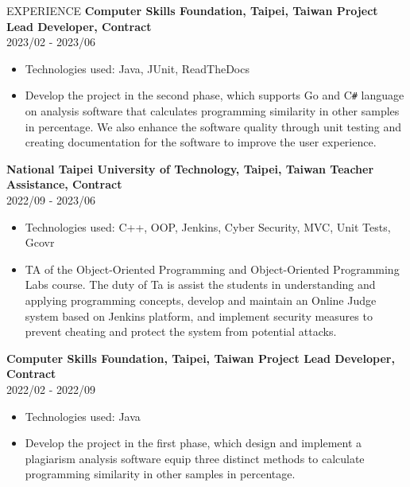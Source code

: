 \documentclass{resume} %
\begin{document}
\begin{rSection}{EXPERIENCE}
{\bf Computer Skills Foundation, Taipei, Taiwan \hfill {Project Lead Developer, Contract}} \\
2023/02 - 2023/06
    \begin{itemize}
        \item {Technologies used: Java, JUnit, ReadTheDocs}
        \item {Develop the project in the second phase, which supports Go and C\verb|#| language on analysis software that calculates programming similarity in other samples in percentage. We also enhance the software quality through unit testing and creating documentation for the software to improve the user experience.}
    \end{itemize}

{\bf National Taipei University of Technology, Taipei, Taiwan \hfill {Teacher Assistance, Contract}} \\
{2022/09 - 2023/06}
    \begin{itemize}
        \item {Technologies used: C++, OOP, Jenkins, Cyber Security, MVC, Unit Tests, Gcovr}
        \item {TA of the Object-Oriented Programming and Object-Oriented Programming Labs course. The duty of Ta is assist the students in understanding and applying programming concepts, develop and maintain an Online Judge system based on Jenkins platform, and implement security measures to prevent cheating and protect the system from potential attacks.}
    \end{itemize}
    
{\bf Computer Skills Foundation, Taipei, Taiwan \hfill {Project Lead Developer, Contract}} \\
2022/02 - 2022/09
    \begin{itemize}
        \item {Technologies used: Java}
        \item {Develop the project in the first phase, which design and implement a plagiarism analysis software equip three distinct methods to calculate programming similarity in other samples in percentage.}
    \end{itemize}
\end{rSection} 
\end{document}
